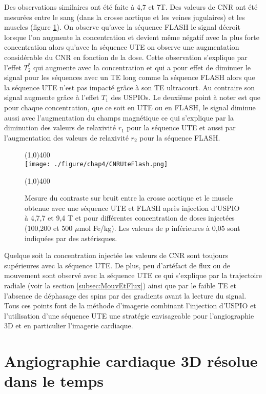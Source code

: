 Des observations similaires ont été faite à 4,7 et 7T. Des valeurs de CNR ont été mesurées entre le sang (dans la crosse aortique et les veines jugulaires) et les muscles (figure \ref{fig:CNRUteFlash}). On observe qu'avec la séquence FLASH le signal décroit lorsque l'on augmente la concentration et devient même négatif avec la plus forte concentration alors qu'avec la séquence UTE on observe une augmentation considérable du CNR en fonction de la dose. Cette observation s'explique par l'effet $T_2^*$ qui augmente avec la concentration et qui a pour effet de diminuer le signal pour les séquences avec un TE long comme la séquence FLASH alors que la séquence UTE n'est pas impacté grâce à son TE ultracourt. Au contraire son signal augmente grâce à l'effet $T_1$ des USPIOs.
Le deuxième point à noter est que pour chaque concentration, que ce soit en UTE ou en FLASH, le signal diminue aussi avec l'augmentation du champs magnétique ce qui s'explique par la diminution des valeurs de relaxivité $r_1$ pour la séquence UTE et aussi par l'augmentation des valeurs de relaxivité $r_2$ pour la séquence FLASH.

\begin{figure}[H]
\centering
\line(1,0){400} \\
\texttt{[image: ./figure/chap4/CNRUteFlash.png]}
\caption[CNR UTE vs Flash]{\label{fig:CNRUteFlash} Mesure du contraste sur bruit entre la crosse aortique et le muscle obtenue avec une séquence UTE et FLASH après injection d'USPIO à 4,7,7 et 9,4 T et pour différentes concentration de doses injectées (100,200 et 500 $\mu$mol Fe/kg). Les valeurs de p inférieures à 0,05 sont indiquées par des astérisques.}
\line(1,0){400} \\ 
\end{figure}

Quelque soit la concentration injectée les valeurs de CNR sont toujours supérieures avec la séquence UTE. De plus, peu d'artéfact de flux ou de mouvement sont observé avec la séquence UTE ce qui s'explique par la trajectoire radiale (voir la section \ref{subsec:MouvEtFlux}) ainsi que par le faible TE et l'absence de déphasage des spins par des gradients avant la lecture du signal.
Tous ces points font de la méthode d'imagerie combinant l'injection d'USPIO et l'utilisation d'une séquence UTE une stratégie envisageable pour l'angiographie 3D et en particulier l'imagerie cardiaque.

\section{Angiographie cardiaque 3D résolue dans le temps}

